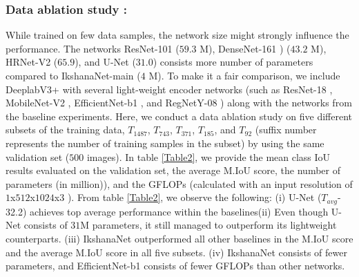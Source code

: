 \documentclass{article}
\begin{document}
\subsubsection{Data ablation study :}
\label{4.2.2}
While trained on few data samples, the network size might strongly influence the performance. The networks ResNet-101 \cite{he2016deep} ($59.3$ M), DenseNet-161 \cite{huang2017densely}) ($43.2$ M), HRNet-V2 \cite{SunZJCXLMWLW19} ($65.9$), and U-Net \cite{ronneberger2015u} ($31.0$) consists more number of parameters compared to IkshanaNet-main ($4$ M). To make it a fair comparison, we include DeeplabV3+ \cite{chen2018encoder} with several light-weight encoder networks (such as ResNet-18 \cite{he2016deep}, MobileNet-V2 \cite{mobileNetV2}, EfficientNet-b1 \cite{TanL19}, and RegNetY-08 \cite{RegNet}) along with the networks from the baseline experiments.\newline
Here, we conduct a data ablation study on five different subsets of the training data, $T_{1487}$, $T_{743}$, $T_{371}$, $T_{185}$, and $T_{92}$ (suffix number represents the number of training samples in the subset)  by using the same validation set ($500$ images). \newline
In table \ref{Table2}, we provide the mean class IoU results evaluated on the validation set,  the average M.IoU score, the number of parameters (in million)), and the GFLOPs \cite{GFLOPS} (calculated with an input resolution of $1$x$512$x$1024$x$3$ ). \newline
From table \ref{Table2}, we observe the following: \newline
(i) U-Net \cite{ronneberger2015u} ($T_{avg}$- 32.2) achieves top average performance within the baselines\newline (ii) Even though U-Net \cite{ronneberger2015u} consists of $31$M parameters, it still managed to outperform its lightweight counterparts.\newline
(iii) IkshanaNet outperformed all other baselines in the M.IoU score and the average M.IoU score in all five subsets.\newline
(iv) IkshanaNet consists of fewer parameters, and EfficientNet-b1 \cite{TanL19} consists of fewer GFLOPs than other networks. 
\end{document}
